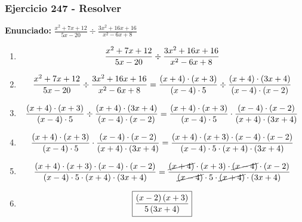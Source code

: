 \documentclass[11pt,a4paper]{article}
\newcommand{\fitmath}[1]{%
\[
\setbox0=\hbox{$\displaystyle #1$}%
\ifdim\wd0>\linewidth
\resizebox{\linewidth}{!}{$\displaystyle #1$}%
\else
#1%
\fi
\]
}
\begin{document}
\subsubsection*{Ejercicio 247 - Resolver}
\textbf{Enunciado:} $ \frac{x^{2} + 7 x + 12}{5 x - 20} \div \frac{3 x^{2} + 16 x + 16}{x^{2} - 6 x + 8} $\par
\begin{enumerate}[leftmargin=2em]
\item \fitmath{\frac{x^{2} + 7 x + 12}{5 x - 20} \div \frac{3 x^{2} + 16 x + 16}{x^{2} - 6 x + 8}}
\item \fitmath{\frac{x^{2} + 7 x + 12}{5 x - 20} \div \frac{3 x^{2} + 16 x + 16}{x^{2} - 6 x + 8}= \frac{\left(x + 4\right)\cdot \left(x + 3\right)}{\left(x - 4\right)\cdot 5} \div \frac{\left(x + 4\right)\cdot \left(3 x + 4\right)}{\left(x - 4\right)\cdot \left(x - 2\right)}}
\item \fitmath{\frac{\left(x + 4\right)\cdot \left(x + 3\right)}{\left(x - 4\right)\cdot 5}\div \frac{\left(x + 4\right)\cdot \left(3 x + 4\right)}{\left(x - 4\right)\cdot \left(x - 2\right)}= \frac{\left(x + 4\right)\cdot \left(x + 3\right)}{\left(x - 4\right)\cdot 5}\cdot \frac{\left(x - 4\right)\cdot \left(x - 2\right)}{\left(x + 4\right)\cdot \left(3 x + 4\right)}}
\item \fitmath{\frac{\left(x + 4\right)\cdot \left(x + 3\right)}{\left(x - 4\right)\cdot 5}\cdot \frac{\left(x - 4\right)\cdot \left(x - 2\right)}{\left(x + 4\right)\cdot \left(3 x + 4\right)}= \frac{\left(x + 4\right)\cdot \left(x + 3\right)\cdot \left(x - 4\right)\cdot \left(x - 2\right)}{\left(x - 4\right)\cdot 5\cdot \left(x + 4\right)\cdot \left(3 x + 4\right)}}
\item \fitmath{\frac{\left(x + 4\right)\cdot \left(x + 3\right)\cdot \left(x - 4\right)\cdot \left(x - 2\right)}{\left(x - 4\right)\cdot 5\cdot \left(x + 4\right)\cdot \left(3 x + 4\right)}= \frac{\cancel{\left(x + 4\right)}\cdot \left(x + 3\right)\cdot \cancel{\left(x - 4\right)}\cdot \left(x - 2\right)}{\cancel{\left(x - 4\right)}\cdot 5\cdot \cancel{\left(x + 4\right)}\cdot \left(3 x + 4\right)}}
\item \fitmath{\boxed{\frac{\left(x - 2\right) \left(x + 3\right)}{5 \left(3 x + 4\right)}}}
\end{enumerate}

\vspace{0.12cm}
\end{document}
